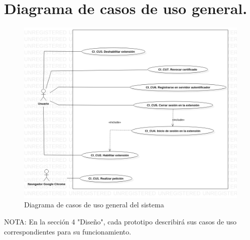 \documentclass[12pt, a4paper, titlepage]{report}
\begin{document}
	    \section{Diagrama de casos de uso general.}
	         \begin{figure}[H]
        		\begin{center}
        		\includegraphics[width=13cm]{./imagenes/Analisis/UCD_General.png}
        		\caption{Diagrama de casos de uso general del sistema}
	            \end{center}
	        \end{figure}   
	        
	        NOTA: En la sección 4 "Diseño", cada prototipo describirá sus casos de uso correspondientes para su funcionamiento.
	
		
		
    
\end{document}
